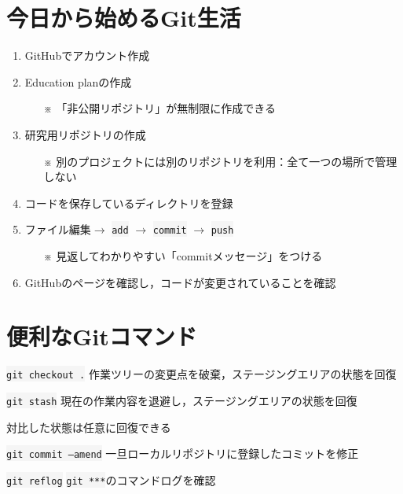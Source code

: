 \documentclass[12pt,dvipdfmx,svgnames,uplatex,aspectratio=169]{beamer}
\newcommand{\git}[1]{{\colorbox{WhiteSmoke}{\texttt{#1}}}}  %
\begin{document}
\section{今日から始めるGit生活}
\begin{frame}{\insertsection}
  \begin{enumerate}
    \item GitHubでアカウント作成
    \item Education planの作成
    \begin{itemize}
      \item[※] 「非公開リポジトリ」が無制限に作成できる
    \end{itemize}
    \item 研究用リポジトリの作成
    \begin{itemize}
      \item[※] 別のプロジェクトには別のリポジトリを利用：全て一つの場所で管理しない
    \end{itemize}
    \item コードを保存しているディレクトリを登録
    \item ファイル編集\(\to\) \git{add} \(\to\) \git{commit} \(\to\) \git{push}
    \begin{itemize}
      \item[※] 見返してわかりやすい「commitメッセージ」をつける
    \end{itemize}
    \item GitHubのページを確認し，コードが変更されていることを確認
  \end{enumerate}
\end{frame}

\section{便利なGitコマンド}
\begin{frame}{\insertsection}
  \begin{block}{\git{git checkout .}}
    作業ツリーの変更点を破棄，ステージングエリアの状態を回復
  \end{block}
  \begin{block}{\git{git stash}}
    現在の作業内容を退避し，ステージングエリアの状態を回復

    対比した状態は任意に回復できる
  \end{block}
  \begin{block}{\git{git commit --amend}}
    一旦ローカルリポジトリに登録したコミットを修正
  \end{block}
  \begin{block}{\git{git reflog}}
    \git{git ***}のコマンドログを確認
  \end{block}

\end{frame}
\end{document}

